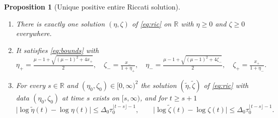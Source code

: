 \documentclass[11pt,a4paper]{article}
\numberwithin{equation}{section}
\newtheorem{proposition}[theorem]{Proposition}
\theoremstyle{remark}\newtheorem{remark}[theorem]{Remark}
\newcommand{\R}{\mathbb R}
\begin{document}
\begin{proposition}[Unique positive entire Riccati solution]\label{prop:riccati}
\begin{enumerate}[label=\textup{(\roman*)}]
\item There is exactly one solution $(\eta,\zeta)$ of \eqref{eq:ric} on $\R$ with $\eta\ge0$ and $\zeta\ge0$
everywhere.
\item It satisfies \eqref{eq:bounds} with
\begin{equation}\label{eq:constants}
\eta_+=\tfrac{\mu-1+\sqrt{(\mu-1)^2+4x_+}}2,\quad \zeta_-=\tfrac{x_-}{1+\eta_+},\quad
\eta_-=\tfrac{\mu-1+\sqrt{(\mu-1)^2+4\zeta_-}}2,\quad \zeta_+=\tfrac{x_+}{1+\eta_-}.
\end{equation}
\item For every $s\in\R$ and $(\eta_0,\zeta_0)\in[0,\infty)^2$ the solution $(\tilde\eta,\tilde\zeta)$ of
\eqref{eq:ric} with data $(\eta_0,\zeta_0)$ at time $s$ exists on $[s,\infty)$, and for $t\ge s+1$
\begin{equation}\label{eq:pullback}
\bigl|\log\tilde\eta(t)-\log\eta(t)\bigr|\le\Delta_0\tau_0^{\lfloor t-s\rfloor-1},\qquad
\bigl|\log\tilde\zeta(t)-\log\zeta(t)\bigr|\le\Delta_0\tau_0^{\lfloor t-s\rfloor-1}.
\end{equation}
\end{enumerate}
\end{proposition}
\end{document}
